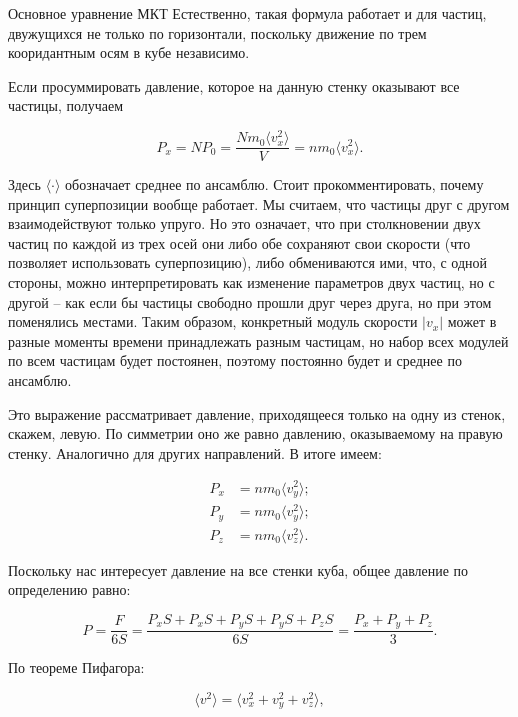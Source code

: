 \documentclass{article}
\newcommand{\abs}[1]{\lvert#1\rvert}
\begin{document}
\begin{section}{Основное уравнение МКТ}
		Естественно, такая формула работает и для частиц, двужущихся не только по горизонтали, поскольку движение по трем кооридантным осям в кубе независимо.

		Если просуммировать давление, которое на данную стенку оказывают все частицы, получаем

		\begin{equation*}
			P_x = NP_0 = \frac{N m_0 \langle v_x^2 \rangle}{V} = n m_0 \langle v_x^2 \rangle.
		\end{equation*}

		Здесь $\langle\cdot\rangle$ обозначает среднее по ансамблю. Стоит прокомментировать, почему принцип суперпозиции вообще работает. Мы считаем, что частицы друг с другом взаимодействуют только упруго. Но это означает, что при столкновении двух частиц по каждой из трех осей они либо обе сохраняют свои скорости (что позволяет использовать суперпозицию), либо обмениваются ими, что, с одной стороны, можно интерпретировать как изменение параметров двух частиц, но с другой -- как если бы частицы свободно прошли друг через друга, но при этом поменялись местами. Таким образом, конкретный модуль скорости $\abs{v_x}$ может в разные моменты времени принадлежать разным частицам, но набор всех модулей по всем частицам будет постоянен, поэтому постоянно будет и среднее по ансамблю.

		Это выражение рассматривает давление, приходящееся только на одну из стенок, скажем, левую. По симметрии оно же равно давлению, оказываемому на правую стенку. Аналогично для других направлений. В итоге имеем:

		\begin{align*}
			P_x &= n m_0 \langle v_y^2 \rangle; \\
			P_y &= n m_0 \langle v_y^2 \rangle; \\
			P_z &= n m_0 \langle v_z^2 \rangle.
		\end{align*}

		Поскольку нас интересует давление на все стенки куба, общее давление по определению равно:

		\begin{equation*}
			P = \frac{F}{6S} = \frac{P_x S + P_x S + P_y S + P_y S + P_z S}{6S} = \frac{P_x + P_y + P_z}{3}.
		\end{equation*}

		По теореме Пифагора:

		\begin{equation*}
			\langle v^2 \rangle = \langle v_x^2 + v_y^2 + v_z^2 \rangle,
		\end{equation*}


\end{section}
\end{document}

